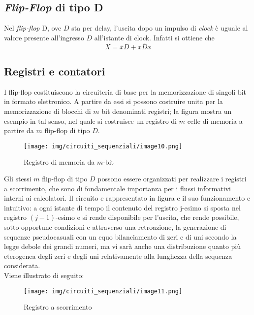 \documentclass[a4paper]{extarticle}
\begin{document}
\subsection{\textit{Flip-Flop} di tipo D}
Nel \textit{flip-flop} D, ove \(D\) sta per delay, l'uscita dopo un impulso di \textit{clock} è uguale al valore presente all'ingresso \(D\) all'istante di clock. Infatti si ottiene che
\[X = \overline{x}D + x \overline{D}x\]

\subsection{Registri e contatori}
I flip-flop costituiscono la circuiteria di base per la memorizzazione di singoli bit in formato elettronico. A partire da essi si possono costruire unita per la memorizzazione di blocchi di \(m\) bit denominati registri; la figura mostra un esempio in tal senso, nel quale si costruisce un registro di \(m\) celle di memoria a partire da \(m\) flip-flop di tipo \(D\).

\begin{figure}[H]
    \centering
        \texttt{[image: img/circuiti\_sequenziali/image10.png]}
    \caption{Registro di memoria da \(m\)-bit}
    \label{fig:registro_di_memoria_da_m_bit}
\end{figure}

\noindent
Gli stessi \(m\) flip-flop di tipo \(D\) possono essere organizzati per realizzare i registri a scorrimento, che sono di fondamentale importanza per i flussi informativi interni ai calcolatori. Il circuito e rappresentato in figura e il suo funzionamento e intuitivo: a ogni istante di tempo il contenuto del registro j-esimo si sposta nel registro \((j - 1)\)-esimo e si rende disponibile per l’uscita, che rende possibile, sotto opportune condizioni e attraverso una retroazione, la generazione di sequenze pseudocasuali con un equo bilanciamento di zeri e di uni secondo la legge debole dei grandi numeri, ma vi sarà anche una distribuzione quanto più eterogenea degli zeri e degli uni relativamente alla lunghezza della sequenza considerata.\\
Viene illustrato di seguito:

\begin{figure}[H]
    \centering
        \texttt{[image: img/circuiti\_sequenziali/image11.png]}
    \caption{Registro a scorrimento}
    \label{fig:registro_scorrimento}
\end{figure}
\end{document}
